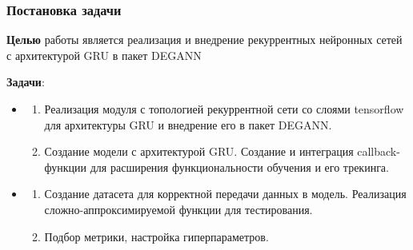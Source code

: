 \documentclass
  [ russian
  , aspectratio=1610 %
  ] {beamer}
\begin{document}
\begin{frame}
    \frametitle{Постановка задачи}
    \textbf{Целью} работы является реализация и внедрение рекуррентных нейронных сетей с архитектурой GRU в пакет DEGANN
    \vspace{1em}

    \textbf{Задачи}:
    \begin{itemize}
        \item{}
            \begin{enumerate}
                \item Реализация модуля с топологией рекуррентной сети со слоями tensorflow для архитектуры GRU и внедрение его в пакет DEGANN.
                \item Создание модели с архитектурой GRU. Создание и интеграция callback-функции для расширения функциональности обучения и его трекинга.
            \end{enumerate}
        \item{}
            \begin{enumerate}
                \item Создание датасета для корректной передачи данных в модель. Реализация сложно-аппроксимируемой функции для тестирования.
                \item Подбор метрики, настройка гиперпараметров.
            \end{enumerate}
    \end{itemize}
\end{frame}

\end{document}
